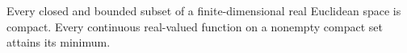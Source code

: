 Every closed and bounded subset of a finite-dimensional real Euclidean space is compact.  Every continuous real-valued function on a nonempty compact set attains its minimum.